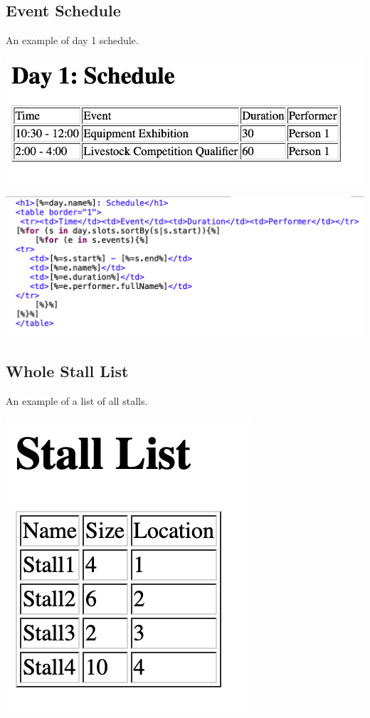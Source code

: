 \documentclass[12pt]{article}
\begin{document}
\subsection{Event Schedule}
An example of day 1 schedule.

\includegraphics[scale = 0.6]{img/schedule}

\includegraphics[scale = 0.6]{img/nestedloop}

\subsection{Whole Stall List}
An example of a list of all stalls.

\includegraphics[scale = 0.6]{img/stall-list}
\end{document}
